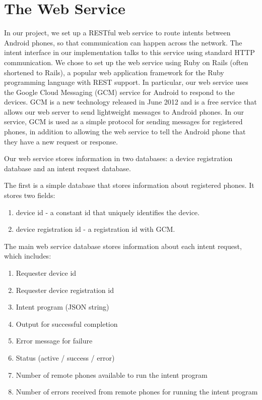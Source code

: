\documentclass{acm_proc_article-sp}
\begin{document}
\section{The Web Service}\label{section:webservice}


In our project, we set up a RESTful web service to route intents between Android phones, so that communication can happen across the network.  The intent interface in our implementation talks to this service using standard HTTP communication.  We chose to set up the web service using Ruby on Rails (often shortened to Rails), a popular web application framework for the Ruby programming language with REST support.   In particular, our web service uses the Google Cloud Messaging (GCM) service for Android to respond to the devices.  GCM is a new technology released in June 2012 and is a free service that allows our web server to send lightweight messages to Android phones.  In our service, GCM is used as a simple protocol for sending messages for registered phones, in addition to allowing the web service to tell the Android phone that they have a new request or response.

Our web service stores information in two databases: a device registration database and an intent request database.


The first is a simple database that stores information about registered phones.  It stores two fields: 

 \begin{enumerate}
 \item device id - a constant id that uniquely identifies the device.
 \item device registration id - a registration id with GCM.
 \end{enumerate}

The main web service database stores information about each intent request, which includes:

\begin{enumerate}
\item Requester device id
\item Requester device registration id
\item Intent program (JSON string)
\item Output for successful completion
\item Error message for failure
\item Status (active / success / error)
\item Number of remote phones available to run the intent program
\item Number of errors received from remote phones for running the intent program
\end{enumerate}
\end{document}
